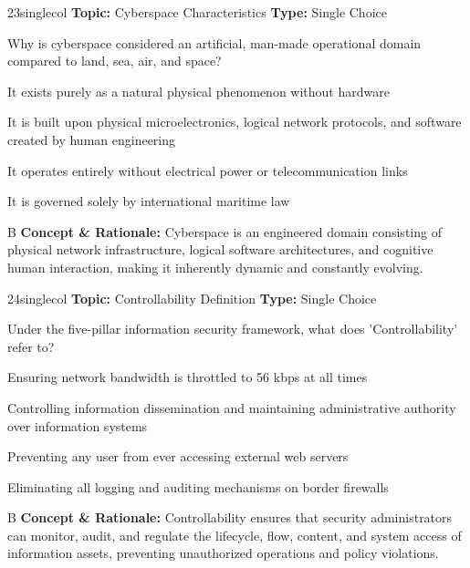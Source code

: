 \begin{qcard}{23}{singlecol}
\textcolor{darkslate!75}{\small\textbf{Topic:} Cyberspace Characteristics \hfill \textbf{Type:} Single Choice}\vspace{0.4em}\par
Why is cyberspace considered an artificial, man-made operational domain compared to land, sea, air, and space?
\begin{qoptions}
\item It exists purely as a natural physical phenomenon without hardware
\item It is built upon physical microelectronics, logical network protocols, and software created by human engineering
\item It operates entirely without electrical power or telecommunication links
\item It is governed solely by international maritime law
\end{qoptions}
\end{qcard}
\nopagebreak
\begin{explainbox}{B}
\textbf{Concept \& Rationale:} Cyberspace is an engineered domain consisting of physical network infrastructure, logical software architectures, and cognitive human interaction, making it inherently dynamic and constantly evolving.
\end{explainbox}

\begin{qcard}{24}{singlecol}
\textcolor{darkslate!75}{\small\textbf{Topic:} Controllability Definition \hfill \textbf{Type:} Single Choice}\vspace{0.4em}\par
Under the five-pillar information security framework, what does 'Controllability' refer to?
\begin{qoptions}
\item Ensuring network bandwidth is throttled to 56 kbps at all times
\item Controlling information dissemination and maintaining administrative authority over information systems
\item Preventing any user from ever accessing external web servers
\item Eliminating all logging and auditing mechanisms on border firewalls
\end{qoptions}
\end{qcard}
\nopagebreak
\begin{explainbox}{B}
\textbf{Concept \& Rationale:} Controllability ensures that security administrators can monitor, audit, and regulate the lifecycle, flow, content, and system access of information assets, preventing unauthorized operations and policy violations.
\end{explainbox}


